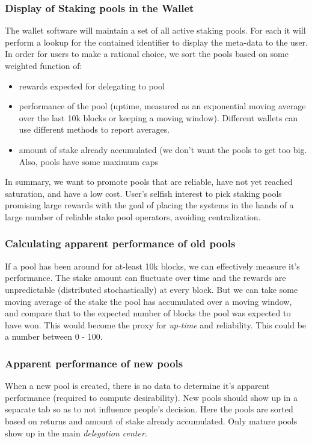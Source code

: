 \subsubsection{Display of Staking pools in the Wallet}
The wallet software will maintain a set of all active staking pools. For each it will perform a lookup for the contained identifier to display the meta-data to the user. 
In order for users to make a rational choice, we sort the pools based on some weighted function of: 
\begin{itemize}
    \item rewards expected for delegating to pool
    \item performance of the pool (uptime, measured as an exponential moving average over the last 10k blocks or keeping a moving window). Different wallets can use different methods to report averages. 
    \item amount of stake already accumulated (we don't want the pools to get too big. Also, pools have some maximum caps
\end{itemize}

In summary, we want to promote pools that are reliable, have not yet reached saturation, and have a low cost. User's selfish interest to pick staking pools promising large rewards with the goal of placing the systems in the hands of a large number of reliable stake pool operators, avoiding centralization. 

\subsubsection{Calculating apparent performance of old pools}
If a pool has been around for at-least 10k blocks, we can effectively measure it's performance. The stake amount can fluctuate over time and the rewards are unpredictable (distributed stochastically) at every block. But we can take some moving average of the stake the pool has accumulated over a moving window, and compare that to the expected number of blocks the pool was expected to have won. This would become the proxy for \textit{up-time} and reliability. This could be a number between 0 - 100. 

\subsubsection{Apparent performance of new pools} 
When a new pool is created, there is no data to determine it's apparent performance (required to compute desirability). New pools should show up in a separate tab so as to not influence people's decision. Here the pools are sorted based on returns and amount of stake already accumulated. Only mature pools show up in the main \textit{delegation center}.

